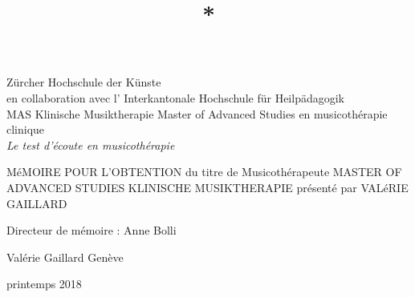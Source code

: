 \title{{*}}

\maketitle
\begin{titlepage}
 \begin{center}
    \Large
     Zürcher Hochschule der Künste\\
 	en collaboration avec l' Interkantonale Hochschule für Heilpädagogik \\
	 MAS Klinische Musiktherapie Master of Advanced Studies en musicothérapie clinique\\
  \vfill
  { \LARGE
\emph{Le test d'écoute en musicothérapie }\\ \bigskip
	 }
 \vfill
 \end{center}
MéMOIRE  POUR L'OBTENTION  du titre de
Musicothérapeute
MASTER OF ADVANCED STUDIES KLINISCHE MUSIKTHERAPIE présenté par VALéRIE GAILLARD

Directeur de mémoire : Anne Bolli

 {\large

	 Valérie Gaillard    \hfill Genève\\
	 \rule{0mm}{1pt} \hfill printemps 2018}

\end{titlepage}
